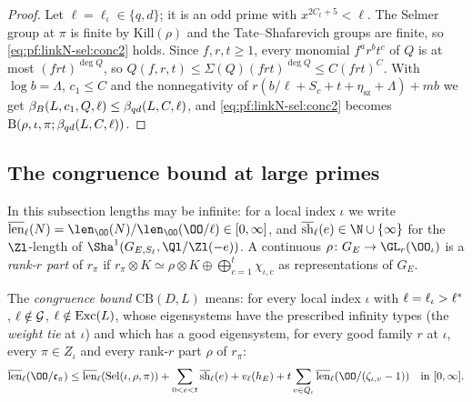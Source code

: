 \begin{proof}
Let $\ell=\ell_\iota\in\{q,d\}$; it is an odd prime with $x^{2C_t+5}<\ell$. The Selmer group at $\pi$ is finite by $\mathrm{Kill}(\rho)$ and the
Tate--Shafarevich groups are finite, so \eqref{eq:pf:linkN-sel:conc2} holds. Since $f,r,t\ge1$, every monomial $f^ar^bt^c$ of $Q$ is at most
$(frt)^{\deg Q}$, so $Q(f,r,t)\le\Sigma(Q)(frt)^{\deg Q}\le C(frt)^C$. With $\log b=\Lambda$, $c_1\le C$ and the nonnegativity of
$r(b/\ell+S_c+t+\eta_{\mathrm{sz}}+\Lambda)+mb$ we get $\beta_B(L,c_1,Q,\ell)\le\beta_{qd}(L,C,\ell)$, and \eqref{eq:pf:linkN-sel:conc2}
becomes $\mathrm{B}(\rho,\iota,\pi;\beta_{qd}(L,C,\ell))$.
\end{proof}

\subsection{The congruence bound at large primes}\label{sec:pf:linkN-sel:large}

In this subsection lengths may be infinite: for a local index $\iota$ we write $\overline{\mathrm{len}}_\ell(N)=\len_\OO(N)/\len_\OO(\OO/\ell)
\in[0,\infty]$, and $\overline{\mathrm{sh}}_\ell(e)\in\N\cup\{\infty\}$ for the $\Zl$-length of $\Sha^1(G_{E,S_\ell},\Ql/\Zl(-e))$. A continuous
$\rho\colon G_E\to\GL_r(\OO_\iota)$ is a \emph{rank-$r$ part} of $r_\pi$ if $r_\pi\otimes K\simeq\rho\otimes K\oplus\bigoplus_{c=1}^t\chi_{\iota,c}$
as representations of $G_E$.

\begin{definition}\label{pf:linkN-sel:congbound}
The \emph{congruence bound} $\mathrm{CB}(D,L)$ means: for every local index $\iota$ with $\ell=\ell_\iota>\ell^{*}$, $\ell\notin\mathcal G$,
$\ell\notin\mathrm{Exc}(L)$, whose eigensystems have the prescribed infinity types (the \emph{weight tie} at $\iota$) and which has a good
eigensystem, for every good family $r$ at $\iota$, every $\pi\in Z_\iota$ and every rank-$r$ part $\rho$ of $r_\pi$:
\[
\overline{\mathrm{len}}_\ell(\OO/\mathfrak c_\pi)\le\overline{\mathrm{len}}_\ell(\linkNselSel(\iota,\rho,\pi))+\sum_{0<e<t}\overline{\mathrm{sh}}_\ell(e)
+v_\ell(h_E)+t\sum_{v\in Q_\iota}\overline{\mathrm{len}}_\ell(\OO/(\zeta_{\iota,v}-1))\quad\text{in }[0,\infty].
\]
\end{definition}

